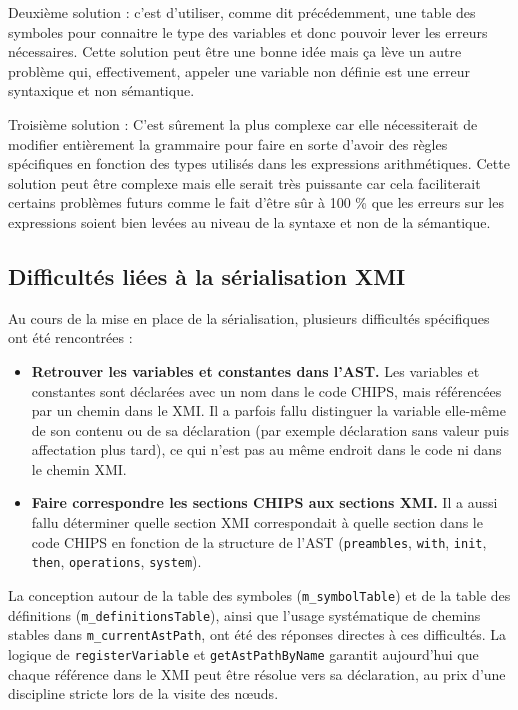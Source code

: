 \documentclass[a4paper, 11pt]{article}
\DeclareRobustCommand{\prog}[1]{\begingroup\urlstyle{tt}\nolinkurl{#1}\endgroup}
\begin{document}
Deuxième solution : c'est d'utiliser, comme dit précédemment, une table des symboles pour connaitre le type des variables et donc pouvoir lever les erreurs nécessaires. Cette solution peut être une bonne idée mais ça lève un autre problème qui, effectivement, appeler une variable non définie est une erreur syntaxique et non sémantique.

Troisième solution : C'est sûrement la plus complexe car elle nécessiterait de modifier entièrement la grammaire pour faire en sorte d'avoir des règles spécifiques en fonction des types utilisés dans les expressions arithmétiques. Cette solution peut être complexe mais elle serait très puissante car cela faciliterait certains problèmes futurs comme le fait d'être sûr à 100 \% que les erreurs sur les expressions soient bien levées au niveau de la syntaxe et non de la sémantique.  

\subsection{Difficultés liées à la sérialisation XMI}

Au cours de la mise en place de la sérialisation, plusieurs difficultés spécifiques ont été rencontrées :

\begin{itemize}
  \item \textbf{Retrouver les variables et constantes dans l’AST.}  
  Les variables et constantes sont déclarées avec un nom dans le code CHIPS, mais référencées par un chemin dans le XMI. Il a parfois fallu distinguer la variable elle-même de son contenu ou de sa déclaration (par exemple déclaration sans valeur puis affectation plus tard), ce qui n’est pas au même endroit dans le code ni dans le chemin XMI.
  \item \textbf{Faire correspondre les sections CHIPS aux sections XMI.}  
  Il a aussi fallu déterminer quelle section XMI correspondait à quelle section dans le code CHIPS en fonction de la structure de l’AST (\prog{preambles}, \prog{with}, \prog{init}, \prog{then}, \prog{operations}, \prog{system}).
\end{itemize}

La conception autour de la table des symboles (\prog{m\_symbolTable}) et de la table des définitions (\prog{m\_definitionsTable}), ainsi que l’usage systématique de chemins stables dans \prog{m\_currentAstPath}, ont été des réponses directes à ces difficultés. La logique de \prog{registerVariable} et \prog{getAstPathByName} garantit aujourd’hui que chaque référence dans le XMI peut être résolue vers sa déclaration, au prix d’une discipline stricte lors de la visite des nœuds.
\end{document}
